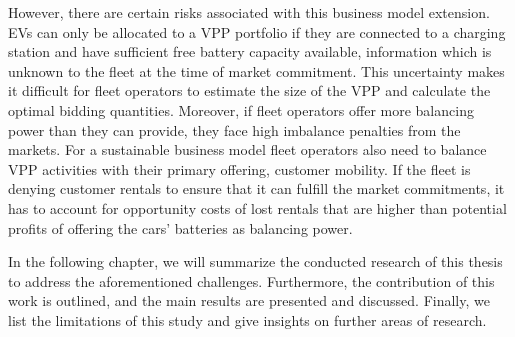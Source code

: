 \documentclass[a4paper, 12pt]{article}
\begin{document}
However, there are certain risks associated with this business model extension.
EVs can only be allocated to a VPP portfolio if they are connected to a charging
station and have sufficient free battery capacity available, information which
is unknown to the fleet at the time of market commitment. This uncertainty makes
it difficult for fleet operators to estimate the size of the VPP and calculate
the optimal bidding quantities. Moreover, if fleet operators offer more
balancing power than they can provide, they face high imbalance penalties from
the markets. For a sustainable business model fleet operators also need to
balance VPP activities with their primary offering, customer mobility. If the
fleet is denying customer rentals to ensure that it can fulfill the market
commitments, it has to account for opportunity costs of lost rentals that are
higher than potential profits of offering the cars' batteries as balancing
power.

In the following chapter, we will summarize the conducted research of this
thesis to address the aforementioned challenges. Furthermore, the contribution
of this work is outlined, and the main results are presented and discussed.
Finally, we list the limitations of this study and give insights on further
areas of research.
\end{document}
